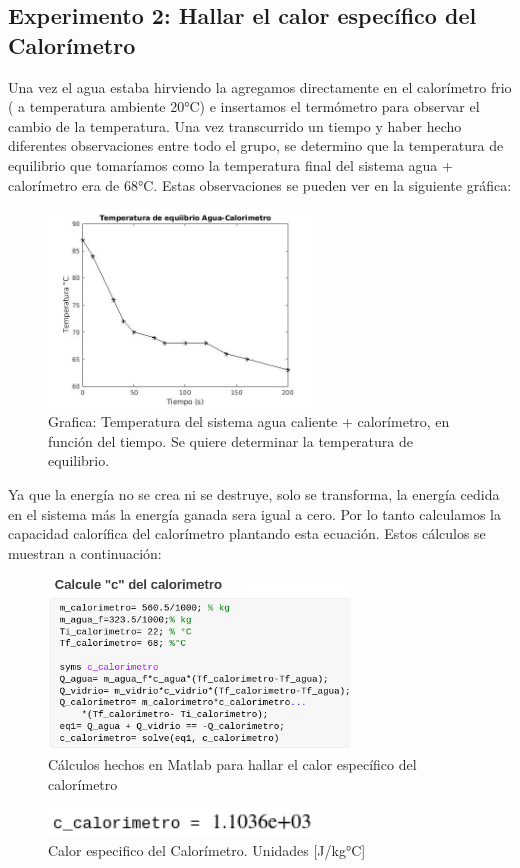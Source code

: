 \documentclass[journal,transmag]{IEEEtran}
\begin{document}
\subsection{Experimento 2: Hallar el calor específico del Calorímetro}

Una vez el agua estaba hirviendo la agregamos directamente en el calorímetro frio ( a temperatura ambiente 20°C) e insertamos el termómetro para observar el cambio de la temperatura. Una vez transcurrido un tiempo y haber hecho diferentes observaciones entre todo el grupo, se determino que la temperatura de equilibrio que tomaríamos como la temperatura final del sistema agua + calorímetro era de 68°C.
Estas observaciones se pueden ver en la siguiente gráfica:

\begin{figure}[!h] 
	\center 
	\includegraphics[width=7cm]{img/grafica.jpg} 
	\caption{Grafica: Temperatura del sistema agua caliente + calorímetro, en función del tiempo. Se quiere determinar la temperatura de equilibrio.} 
	\label{T4} 
\end{figure} 


Ya que la energía no se crea ni se destruye, solo se transforma, la energía cedida en el sistema más la energía ganada sera igual a cero. Por lo tanto calculamos la capacidad calorífica del calorímetro plantando esta ecuación.
Estos cálculos se muestran a continuación:

\begin{figure}[!h] 
	\center 
	\includegraphics[width=8cm]{img/ans2.png} 
	\caption{Cálculos hechos en Matlab para hallar el calor específico del calorímetro} 
	\label{T4} 
\end{figure} 
\begin{figure}[!h] 
	\center 
	\includegraphics[width=7cm]{img/ans22.png} 
	\caption{Calor especifico del Calorímetro. Unidades [J/kg°C]} 
	\label{T4} 
\end{figure} 
\end{document}
